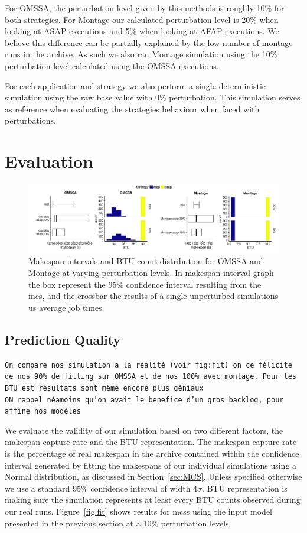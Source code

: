 \documentclass[10pt,conference,compsocconf]{IEEEtran}
\begin{document}
For OMSSA, the perturbation level given by this methods is roughly 10\% for both
strategies. For Montage  our calculated perturbation level is  20\% when looking
at ASAP  executions and  5\% when  looking at AFAP  executions. We  believe this
difference can be partially  explained by the low number of  montage runs in the
archive. As  such we  also ran  Montage simulation  using the  10\% perturbation
level calculated using the OMSSA executions.

For  each  application and  strategy  we  also  perform a  single  deterministic
simulation  using the  raw base  value  with 0\%  perturbation. This  simulation
serves as  reference when  evaluating the strategies  behaviour when  faced with
perturbations.

\section{Evaluation}
\label{sec:eval}

\begin{figure}
	\includegraphics[width=\textwidth]{gfx/int_plot.pdf}
	\caption{Makespan intervals and BTU count distribution for OMSSA and 
	Montage at varying perturbation levels.	In makespan interval graph the 
	box represent the 95\% confidence interval resulting from the \acs{mcs},
	and the crossbar the results of a single unperturbed simulations us 
	average job times.}\label{fig:int}
\end{figure}

\subsection{Prediction Quality}

\texttt{On compare nos simulation a la réalité (voir fig:fit) on ce félicite de
nos 90\% de fitting sur OMSSA et de nos 100\% avec montage. Pour les BTU est
résultats sont même encore plus géniaux\\
ON rappel néamoins qu'on avait le benefice d'un gros backlog, pour affine nos
modéles}

We evaluate the validity of our simulation based on two different factors, the
makespan capture rate and the BTU representation. The makespan capture rate is
the percentage of real makespan in the archive contained within the confidence
interval generated by fitting the makespans of our individual simulations using
a Normal distribution, as discussed in Section~\ref{sec:MCS}. Unless specified
otherwise we use a standard 95\% confidence interval of width $4\sigma$. BTU
representation is making sure the simulation represents at least every BTU
counts observed during our real runs. Figure~\ref{fig:fit} shows results for
\acp{mcs} using the input model presented in the previous section at a 10\%
perturbation levels.
\end{document}
